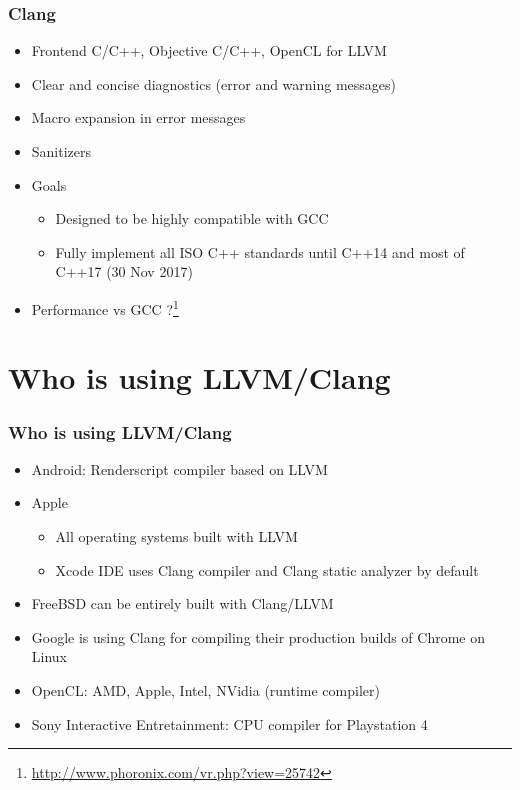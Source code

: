 \documentclass{beamer}
\begin{document}
\begin{frame}
\frametitle{Clang}
\begin{itemize}
  \item Frontend C/C++, Objective C/C++, OpenCL for LLVM
  \item Clear and concise diagnostics (error and warning messages)
  \item Macro expansion in error messages
  \item Sanitizers
  \item Goals
  \begin{itemize}
    \item Designed to be highly compatible with GCC
    \item Fully implement all ISO C++ standards until C++14 and most of C++17 (30 Nov 2017)
  \end{itemize}
  \item Performance vs GCC ?\footnote{\url{http://www.phoronix.com/vr.php?view=25742}}
\end{itemize}
\end{frame}
\section{Who is using LLVM/Clang}

\begin{frame}
\frametitle{Who is using LLVM/Clang}
\begin{itemize}
  \item Android: Renderscript compiler based on LLVM
  \item Apple
  \begin{itemize}
    \item All operating systems built with LLVM
    \item Xcode IDE uses Clang compiler and Clang static analyzer by default
  \end{itemize}
  \item FreeBSD can be entirely built with Clang/LLVM
  \item Google is using Clang for compiling their production builds of Chrome on Linux
  \item OpenCL: AMD, Apple, Intel, NVidia (runtime compiler)
  \item Sony Interactive Entretainment: CPU compiler for Playstation 4
\end{itemize}
\end{frame}
\end{document}
